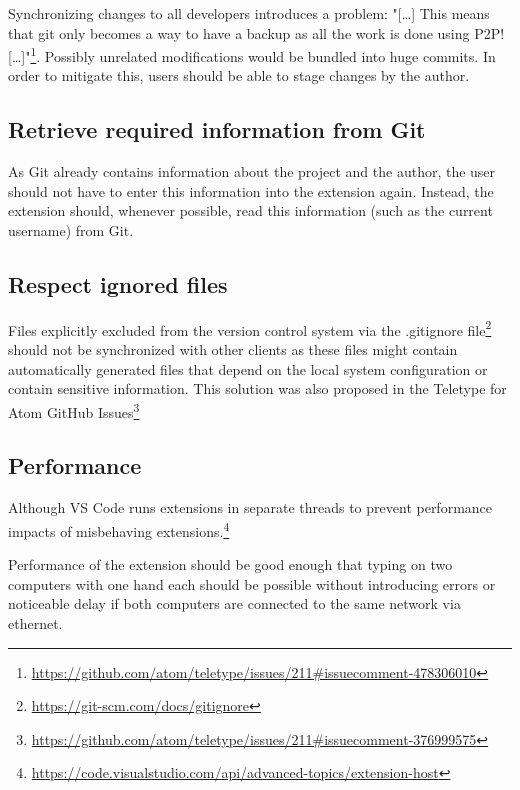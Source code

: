 Synchronizing changes to all developers introduces a problem:
"[\dots] This means that git only becomes a way to have a backup as all the work is done using P2P! [\dots]"\footnote{\href{https://github.com/atom/teletype/issues/211\#issuecomment-478306010}{https://github.com/atom/teletype/issues/211\#issuecomment-478306010}}.
Possibly unrelated modifications would be bundled into huge commits. In order to mitigate this, users should be able to stage changes by the author.

\subsection{Retrieve required information from Git}

As Git already contains information about the project and the author, the user should not have to enter this information into the extension again. Instead, the extension should, whenever possible, read this information (such as the current username) from Git.

\subsection{Respect ignored files}

Files explicitly excluded from the version control system via the .gitignore file\footnote{\href{https://git-scm.com/docs/gitignore}{https://git-scm.com/docs/gitignore}} should not be synchronized with other clients as these files might contain automatically generated files that depend on the local system configuration or contain sensitive information. This solution was also proposed in the Teletype for Atom GitHub Issues\footnote{\href{https://github.com/atom/teletype/issues/211\#issuecomment-376999575}{https://github.com/atom/teletype/issues/211\#issuecomment-376999575}}

\subsection{Performance}

Although VS Code runs extensions in separate threads to prevent performance impacts of misbehaving extensions.\footnote{\href{https://code.visualstudio.com/api/advanced-topics/extension-host}{https://code.visualstudio.com/api/advanced-topics/extension-host}}

Performance of the extension should be good enough that typing on two computers with one hand each should be possible without introducing errors or noticeable delay if both computers are connected to the same network via ethernet.

